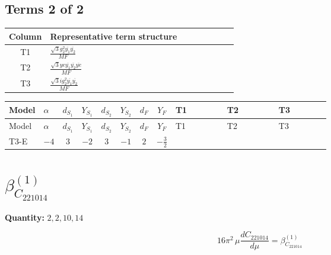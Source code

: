 \documentclass[8pt]{article}
\begin{document}
\begin{landscape}
\subsection*{Terms 2 of 2}
\begin{center}
\begin{tabular}{@{}c >{\raggedright\arraybackslash}p{0.82\linewidth}@{}}
\toprule
Column & Representative term structure \\
\midrule
T1 & \(\displaystyle \frac{\sqrt{3} g_{2}^{2} \overline{y_{1}} \overline{y_{2}}}{MF}\) \\
\midrule
T2 & \(\displaystyle \frac{\sqrt{3} ye \overline{y_{1}} \overline{y_{2}} \overline{ye}}{MF}\) \\
\midrule
T3 & \(\displaystyle \frac{\sqrt{3} i g_{2}^{2} \overline{y_{1}} \overline{y_{2}}}{MF}\) \\
\midrule
\bottomrule
\end{tabular}
\end{center}
\smallskip
\tiny
\begin{longtable}{@{}llcccccc >{\raggedright\arraybackslash}p{0.21\linewidth} >{\raggedright\arraybackslash}p{0.21\linewidth} >{\raggedright\arraybackslash}p{0.21\linewidth}@{}}
\toprule
Model & $\alpha$ & $d_{S_1}$ & $Y_{S_1}$ & $d_{S_2}$ & $Y_{S_2}$ & $d_F$ & $Y_F$ & T1 & T2 & T3 \\
\midrule
\endfirsthead
\toprule
Model & $\alpha$ & $d_{S_1}$ & $Y_{S_1}$ & $d_{S_2}$ & $Y_{S_2}$ & $d_F$ & $Y_F$ & T1 & T2 & T3 \\
\midrule
\endhead
T3-E & $-4$ & $3$ & $-2$ & $3$ & $-1$ & $2$ & $-\frac{3}{2}$ & \scriptsize\adjustbox{max width=\linewidth}{$\begin{gathered} \frac{11 \sqrt{3} g_{2}^{2} \overline{y_{1}} \overline{y_{2}}}{8 MF}\end{gathered}$} & \scriptsize\adjustbox{max width=\linewidth}{$\begin{gathered} - \frac{\sqrt{3} ye \overline{y_{1}} \overline{y_{2}} \overline{ye}}{12 MF}\end{gathered}$} & \scriptsize\adjustbox{max width=\linewidth}{$\begin{gathered} \frac{\sqrt{3} i g_{2}^{2} \overline{y_{1}} \overline{y_{2}}}{6 MF}\end{gathered}$} \\
\midrule
\bottomrule
\end{longtable}
\clearpage
\section*{$\beta_{C_{221014}}^{(1)}$}
\noindent\textbf{Quantity: }$\mathrm{2,2,10,14}$\par\smallskip
\[16\pi^2\,\mu\frac{d C_{221014}}{d\mu}=\beta_{C_{221014}}^{(1)}\]

\end{landscape}
\end{document}
